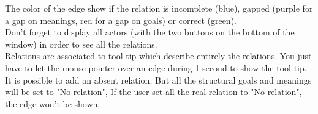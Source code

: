 The color of the edge show if the relation is incomplete (blue), gapped (purple for a gap on meanings, red for a gap on goals) or correct (green).\\

Don't forget to display all actors (with the two buttons on the bottom of the window) in order to see all the relations.\\

Relations are associated to tool-tip which describe entirely the relations. You just have to let the mouse pointer over an edge during 1 second to show the tool-tip.\\

It is possible to add an absent relation. But all the structural goals and meanings will be set to "No relation", If the user set all the real relation to "No relation", the edge won't be shown.\\


